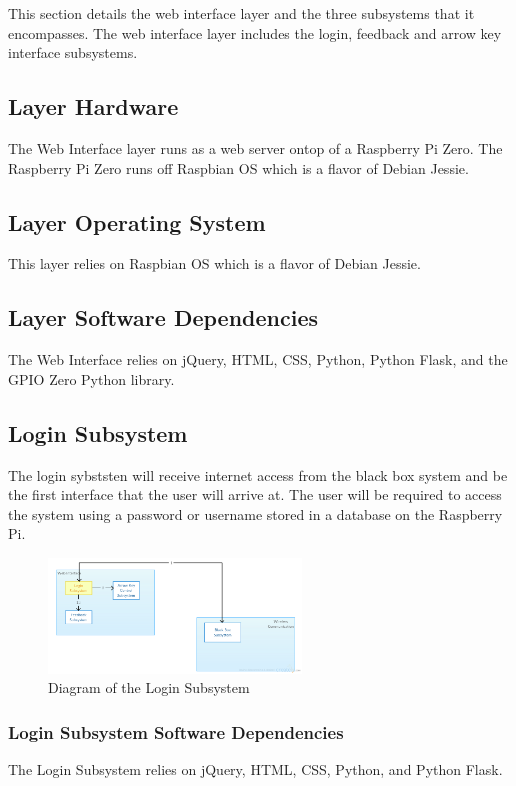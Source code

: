 This section details the web interface layer and the three subsystems that it encompasses. The web interface layer includes the login, feedback and arrow key interface subsystems.

\subsection{Layer Hardware}
The Web Interface layer runs as a web server ontop of a Raspberry Pi Zero. The Raspberry Pi Zero runs off Raspbian OS which is a flavor of Debian Jessie. 

\subsection{Layer Operating System}
This layer relies on Raspbian OS which is a flavor of Debian Jessie.

\subsection{Layer Software Dependencies}
The Web Interface relies on jQuery, HTML, CSS, Python, Python Flask, and the GPIO Zero Python library.

\subsection{Login Subsystem}
The login sybststen will receive internet access from the black box system and be the first interface that the user will arrive at. The user will be required to access the system using a password or username stored in a database on the Raspberry Pi.

\begin{figure}[h!]
	\centering
 	\includegraphics[width=0.60\textwidth]{images/ADSdiagrams/loginsubsystem.png}
 \caption{Diagram of the Login Subsystem}
\end{figure}

\subsubsection{Login Subsystem Software Dependencies}
The Login Subsystem relies on jQuery, HTML, CSS, Python, and Python Flask.

